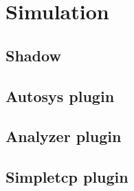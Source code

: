 \section{Simulation}
\label{sec:simulation}
\subsection{Shadow}
\subsection{Autosys plugin}
\subsection{Analyzer plugin}
\subsection{Simpletcp plugin}
